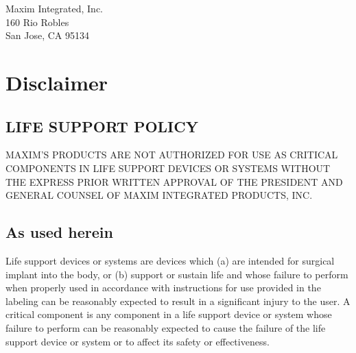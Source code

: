 \documentclass[twoside]{book}
\newcommand\docrev{Revision F }
\newcommand\docref{SPEC98T17 }
\newcommand\docdate{07/16/2017 }
\newcommand{\+}{\discretionary{\mbox{\scriptsize$\hookleftarrow$}}{}{}}
\begin{document}
\hypersetup{pageanchor=false,
             bookmarksnumbered=true,
             pdfencoding=unicode
            }
\begin{titlepage}
\vspace*{7cm}

\vspace*{7cm}
\begin{flushright}
Maxim Integrated, Inc.\\
160 Rio Robles\\
San Jose, CA 95134\\
\end{flushright}

\end{titlepage}

\section*{Disclaimer}

\subsection*{LIFE SUPPORT POLICY}
MAXIM’S PRODUCTS ARE NOT AUTHORIZED FOR USE AS CRITICAL COMPONENTS IN LIFE SUPPORT DEVICES OR SYSTEMS WITHOUT THE EXPRESS PRIOR WRITTEN APPROVAL OF THE PRESIDENT AND GENERAL COUNSEL OF MAXIM INTEGRATED PRODUCTS, INC. 

\subsection*{As used herein}
Life support devices or systems are devices which (a) are intended for surgical implant into the body, or (b) support or sustain life and whose failure to perform when properly used in accordance with instructions for use provided in the labeling can be reasonably expected to result in a significant injury to the user. A critical component is any component in a life support device or system whose failure to perform can be reasonably expected to cause the failure of the life support device or system or to affect its safety or effectiveness.
\end{document}
